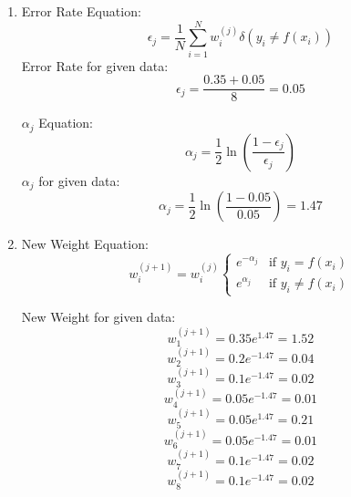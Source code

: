 \documentclass{article}
\begin{document}
\begin{enumerate}
    \item 
    Error Rate Equation:
    \begin{equation}
        \epsilon_j = \frac{1}{N}\sum_{i=1}^{N}w_i^{(j)}\delta(y_i \neq f(x_i))
    \end{equation}
    Error Rate for given data:
    \begin{equation}
        \epsilon_j = \frac{0.35 + 0.05 }{8} = 0.05
    \end{equation}

    $\alpha_j$ Equation:
    \begin{equation}
        \alpha_j = \frac{1}{2}\ln\left(\frac{1-\epsilon_j}{\epsilon_j}\right)
    \end{equation}
    $\alpha_j$ for given data:
    \begin{equation}
        \alpha_j = \frac{1}{2}\ln\left(\frac{1-0.05}{0.05}\right) = 1.47
    \end{equation}

    \item
    New Weight Equation:
    \begin{equation}
        w_i^{(j+1)} = w_i^{(j)}
        \begin{cases}
            e^{-\alpha_j} & \text{if } y_i = f(x_i) \\
            e^{\alpha_j} & \text{if } y_i \neq f(x_i)    
        \end{cases}
    \end{equation}

    New Weight for given data:
    \begin{equation}
        w_1^{(j+1)} = 0.35e^{1.47} = 1.52
    \end{equation}
    \begin{equation}
        w_2^{(j+1)} = 0.2e^{-1.47} = 0.04
    \end{equation}
    \begin{equation}
        w_3^{(j+1)} = 0.1e^{-1.47} = 0.02
    \end{equation}
    \begin{equation}
        w_4^{(j+1)} = 0.05e^{-1.47} = 0.01
    \end{equation}
    \begin{equation}
        w_5^{(j+1)} = 0.05e^{1.47} = 0.21
    \end{equation}
    \begin{equation}
        w_6^{(j+1)} = 0.05e^{-1.47} = 0.01
    \end{equation}
    \begin{equation}
        w_7^{(j+1)} = 0.1e^{-1.47} = 0.02
    \end{equation}
    \begin{equation}
        w_8^{(j+1)} = 0.1e^{-1.47} = 0.02
    \end{equation}
    
\end{enumerate}
\end{document}
